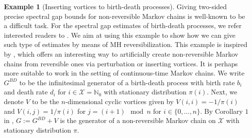 \documentclass[12pt,a4]{amsart}
\numberwithin{equation}{section}
\theoremstyle{plain}
\theoremstyle{definition}
\newtheorem{example}{Example}[section]
\theoremstyle{remark}
\newcommand{\1}{\mathds{1}}
\begin{document}
\begin{example}[Inserting vortices to birth-death processes]
	Giving two-sided precise spectral gap bounds for non-reversible Markov chains is well-known to be a difficult task. For the spectral gap estimates of birth-death processes, we refer interested readers to \cite{Chen96}. We aim at using this example to show how we can give such type of estimates by means of MH reversibilization. This example is inspired by \cite{SGS10, Bie16}, which offers an interesting way to artificially create non-reversible Markov chains from reversible ones via perturbation or inserting vortices.
	It is perhaps more suitable to work in the setting of continuous-time Markov chains. We write $G^{BD}$ to be the infinitesimal generator of a birth-death process with birth rate $b_i$ and death rate $d_i$ for $i \in \mathcal{X} = \mathbb{N}_0$ with stationary distribution $\pi(i)$. Next, we denote $V$ to be the $n$-dimensional cyclic vortices given by $V(i,i) = -1/\pi(i)$ and $V(i,j) = 1/\pi(i)$ for $j = (i+1) \mod{n}$ for $i \in \{0,\ldots,n\}$. By Corollary $1$ in \cite{SGS10}, $G := G^{BD} + V$ is the generator of a non-reversible Markov chain on $\mathcal{X}$ with stationary distribution $\pi$.
	

\end{example}
\end{document}
